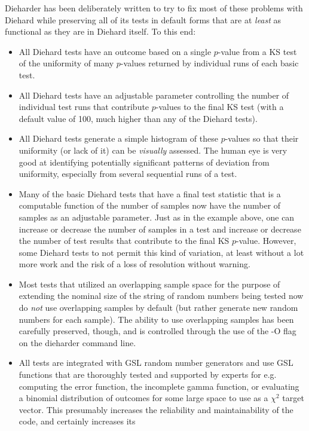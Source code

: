 \documentclass[12pt]{article}
\begin{document}
Dieharder has been deliberately written to try to fix most of these
problems with Diehard while preserving all of its tests in default forms
that are at {\em least} as functional as they are in Diehard itself.  To
this end:

\begin{itemize}

 \item All Diehard tests have an outcome based on a single $p$-value
from a KS test of the uniformity of many $p$-values returned by
individual runs of each basic test.
 \item All Diehard tests have an adjustable parameter controlling the
number of individual test runs that contribute $p$-values to the final
KS test (with a default value of 100, much higher than any of the
Diehard tests).
 \item All Diehard tests generate a simple histogram of these $p$-values
so that their uniformity (or lack of it) can be {\em visually} assessed.
The human eye is very good at identifying potentially significant
patterns of deviation from uniformity, especially from several
sequential runs of a test.
 \item Many of the basic Diehard tests that have a final test statistic
that is a computable function of the number of samples now have the
number of samples as an adjustable parameter.  Just as in the example
above, one can increase or decrease the number of samples in a test and
increase or decrease the number of test results that contribute to the
final KS $p$-value.  However, some Diehard tests to not permit this kind
of variation, at least without a lot more work and the risk of a loss of
resolution without warning.
 \item Most tests that utilized an overlapping sample space for the
purpose of extending the nominal size of the string of random numbers
being tested now do {\em not} use overlapping samples by default (but
rather generate new random numbers for each sample).  The ability to use
overlapping samples has been carefully preserved, though, and is
controlled through the use of the -O flag on the dieharder command line.
 \item All tests are integrated with GSL random number generators and
use GSL functions that are thoroughly tested and supported by experts
for e.g. computing the error function, the incomplete gamma function, or
evaluating a binomial distribution of outcomes for some large space to
use as a $\chi^2$ target vector.  This presumably increases the
reliability and maintainability of the code, and certainly increases its

\end{itemize}
\end{document}
